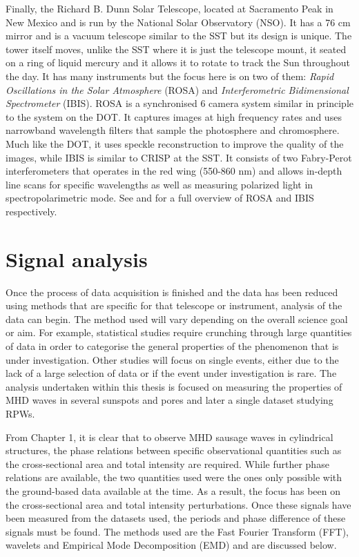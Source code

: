 	Finally, the Richard B. Dunn Solar Telescope, located at Sacramento Peak in New Mexico and is run by the National Solar Observatory (NSO).
    It has a 76 cm mirror and is a vacuum telescope similar to the SST but its design is unique.
    The tower itself moves, unlike the SST where it is just the telescope mount, it seated on a ring of liquid mercury and it allows it to rotate to track the Sun throughout the day. 
    It has many instruments but the focus here is on two of them: \textit{Rapid Oscillations in the Solar Atmosphere} (ROSA) and \textit{Interferometric Bidimensional Spectrometer} (IBIS).
    ROSA is a synchronised 6 camera system similar in principle to the system on the DOT. 
    It captures images at high frequency rates and uses narrowband wavelength filters that sample the photosphere and chromosphere.
    Much like the DOT, it uses speckle reconstruction to improve the quality of the images, while IBIS is similar to CRISP at the SST.
    It consists of two Fabry-Perot interferometers that operates in the red wing (550-860 nm) and allows in-depth line scans for specific wavelengths as well as measuring polarized light in spectropolarimetric mode.
    See \cite{jess1} and \cite{cavallini2006ibis} for a full overview of ROSA and IBIS respectively.
       
\section{Signal analysis}

	Once the process of data acquisition is finished and the data has been reduced using methods that are specific for that telescope or instrument, analysis of the data can begin.
    The method used will vary depending on the overall science goal or aim.
    For example, statistical studies require crunching through large quantities of data in order to categorise the general properties of the phenomenon that is under investigation. 
	Other studies will focus on single events, either due to the lack of a large selection of data or if the event under investigation is rare.
	The analysis undertaken within this thesis is focused on measuring the properties of MHD waves in several sunspots and pores and later a single dataset studying RPWs.
   	
	From Chapter 1, it is clear that to observe MHD sausage waves in cylindrical structures, the phase relations between specific observational quantities such as the cross-sectional area and total intensity are required.
    While further phase relations are available, the two quantities used were the ones only possible with the ground-based data available at the time.
    As a result, the focus has been on the cross-sectional area and total intensity perturbations. 
    Once these signals have been measured from the datasets used, the periods and phase difference of these signals must be found.
    The methods used are the Fast Fourier Transform (FFT), wavelets and Empirical Mode Decomposition (EMD) and are discussed below.
     
